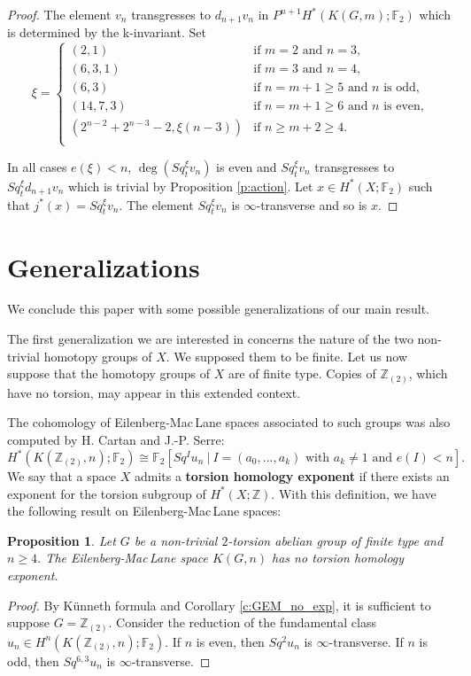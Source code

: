 \documentclass{amsart}
\newtheorem{prop}[thm]{Proposition}
\theoremstyle{definition}
\theoremstyle{remark}
\newcommand{\Z}{\mathbb{Z}}
\newcommand{\F}{\mathbb{F}}
\renewcommand{\geq}{\geqslant}
\begin{document}
\begin{proof}
The element $v_n$ transgresses to $d_{n+1}v_n$ in $P^{n+1}H^*(K(G,m);\F_2)$ which is determined by the k-invariant. Set 
$$
\xi=\begin{cases}
(2,1) &\text{if $m=2$ and $n=3$,}\\
(6,3,1) &\text{if $m=3$ and $n=4$,}\\
(6,3) &\text{if $n=m+1\geq5$ and $n$ is odd,}\\
(14,7,3) &\text{if $n=m+1\geq6$ and $n$ is even,}\\
(2^{n-2}+2^{n-3}-2,\xi(n-3)) &\text{if $n\geq m+2\geq4$.}\\
\end{cases}
$$

In all cases $e(\xi)<n$, $\deg(Sq^\xi_t v_n)$ is even and $Sq_{t}^\xi v_n$ transgresses to $Sq_t^\xi d_{n+1}v_n$ which is trivial by Proposition \ref{p:action}. Let $x\in H^*(X;\F_2)$ such that $j^*(x)=Sq_t^\xi v_n$. The element $Sq_t^\xi v_n$ is $\infty$-transverse and so is $x$.
\end{proof}

\section{Generalizations}\label{s:generalizations}

We conclude this paper with some possible generalizations of our main result.

The first generalization we are interested in concerns the nature of the two non-trivial homotopy groups of $X$. We supposed them to be finite. Let us now suppose that the homotopy groups of $X$ are of finite type. Copies of $\Z_{(2)}$, which have no torsion, may appear in this extended context. 

\newpage
The cohomology of Eilenberg-Mac\,Lane spaces associated to such groups was also computed by H. Cartan and J.-P. Serre:
$$
H^*(K(\Z_{(2)},n);\F_2)\cong\F_2[Sq^Iu_n\ |\ \text{$I=(a_0,...,a_k)$ with $a_k\not=1$ and $e(I)<n$}].
$$
We say that a space $X$ admits a {\bf torsion homology exponent} if there exists an exponent for the torsion subgroup of $H^*(X;\Z)$. With this definition, we have the following result on Eilenberg-Mac\,Lane spaces:

\begin{prop}
Let $G$ be a non-trivial $2$-torsion abelian group of finite type and $n\geq4$. The Eilenberg-Mac\,Lane space $K(G,n)$ has no torsion homology exponent.
\end{prop}

\begin{proof}
By K\"unneth formula and Corollary \ref{c:GEM_no_exp}, it is sufficient to suppose $G=\Z_{(2)}$. Consider the reduction of the fundamental class $u_n\in H^n(K(\Z_{(2)},n);\F_2)$. If $n$ is even, then $Sq^{2}u_n$ is $\infty$-transverse. If $n$ is odd, then $Sq^{6,3}u_n$ is $\infty$-transverse. 
\end{proof}
\end{document}

